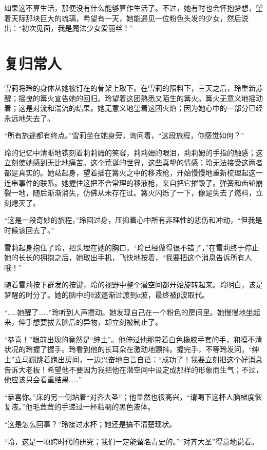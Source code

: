 如果这不算生活，那便没有什么能够算作生活了。不过，她有时也会怀抱梦想，望着天际那块巨大的琉璃，希望有一天，她能遇见一位粉色头发的少女，然后说出：“初次见面，我是魔法少女爱丽丝！”

\section{ 复归常人}

雪莉将玲的身体从她被钉在的骨架上取下。在雪莉的照料下，三天之后，玲重新苏醒；摇曳的篝火宣告她的回归。玲望着这团熟悉又陌生的篝火。篝火无意义地摇动着；这是对流和湍流的结果。她无意义地望着这团火焰；因为她心中的一部分已经永远地失去了。

“所有旅途都有终点。”雪莉坐在她身旁，询问着，“这段旅程，你感觉如何？”

玲的记忆中清晰地镌刻着莉莉姆的笑容，莉莉姆的眼泪，莉莉姆的手指的触感；这立刻使她感到无比地痛苦。这个荒诞的世界，这些真挚的情感；玲无法接受这两者都是真实的。她站起身，望着插在篝火之中的移液枪，开始慢慢地重新梳理起这一连串事件的联系。她握住这把不合常理的移液枪，亲自把它摧毁了。弹簧和齿轮崩裂一地，随后渐渐消失，仿佛从未存在过。篝火闪烁了一下，像是失去了燃料，立刻熄灭了。

“这是一段奇妙的旅程，”玲回过身，压抑着心中所有非理性的悲伤和冲动，“但我是时候该回去了。”

雪莉起身抱住了玲，把头埋在她的胸口，“玲已经做得很不错了，”在雪莉终于停止她的长长的拥抱之后，她取出手机，飞快地按着，“我要把这个消息告诉所有人哦！”

随着雪莉按下群发的按键，玲的视野中整个潜空间都开始旋转起来。玲明白，该是梦醒的时分了。她的脑中的θ波逐渐过渡到α波，最终被β波取代。

“……她醒了……”玲听到人声攒动。她发现自己在一个粉色的房间里。她慢慢地坐起来，伸手想要拔去脑后的异物，却立刻被制止了。

“恭喜！”眼前出现的竟然是“绅士”。他伸过他那带着白色橡胶手套的手，和摸不清状况的玲握了握手。玲看到他的长耳朵在激动地颤抖。握完手，不等玲发问，“绅士”立马蹦跳着跑出房间，一边兴奋地自言自语：“成功了！我要立刻把这个好消息告诉大老板！希望他不要因为我把他在潜空间中设定成那样的形象而生气；不过，他应该只会看重结果……”

“恭喜你。”床的另一侧站着“对齐大圣”；他显然也很高兴，“请喝下这杯人脑梯度恢复液。”他毛茸茸的手递过一杯粘稠的黑色液体。

“这是怎么回事？”玲接过水杯；她还是搞不清楚现状。

“玲，这是一项跨时代的研究；我们一定能留名青史的。”“对齐大圣”得意地说着。

